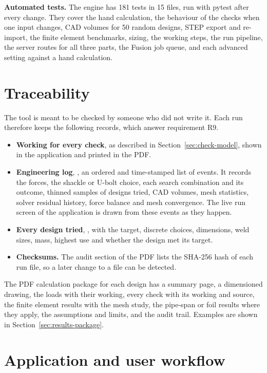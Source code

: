 \textbf{Automated tests.} The engine has 181 tests in 15 files, run with
pytest after every change. They cover the hand calculation, the behaviour of
the checks when one input changes, CAD volumes for 50 random designs, STEP
export and re-import, the finite element benchmarks, sizing, the working
steps, the run pipeline, the server routes for all three parts, the Fusion
job queue, and each advanced setting against a hand calculation.

\section{Traceability}
\label{sec:traceability}

The tool is meant to be checked by someone who did not write it. Each run
therefore keeps the following records, which answer requirement R9.

\begin{itemize}
    \item \textbf{Working for every check}, as described in
    Section~\ref{sec:check-model}, shown in the application and printed in the
    PDF.
    \item \textbf{Engineering log}, , an ordered and
    time-stamped list of events. It records the forces, the shackle or U-bolt choice,
    each search combination and its outcome, thinned samples of designs tried,
    CAD volumes, mesh statistics, solver residual history, force balance and
    mesh convergence. The live run screen of the application is drawn from
    these events as they happen.
    \item \textbf{Every design tried}, , with the
    target, discrete choices, dimensions, weld sizes, mass, highest use and
    whether the design met its target.
    \item \textbf{Checksums.} The audit section of the PDF lists the SHA-256
    hash of each run file, so a later change to a file can be detected.
\end{itemize}

The PDF calculation package for each design has a summary page, a
dimensioned drawing, the loads with their working, every check with its
working and source, the finite element results with the mesh study, the
pipe-span or foil results where they apply, the assumptions and limits, and
the audit trail. Examples are shown in Section~\ref{sec:results-package}.

\section{Application and user workflow}
\label{sec:application}

